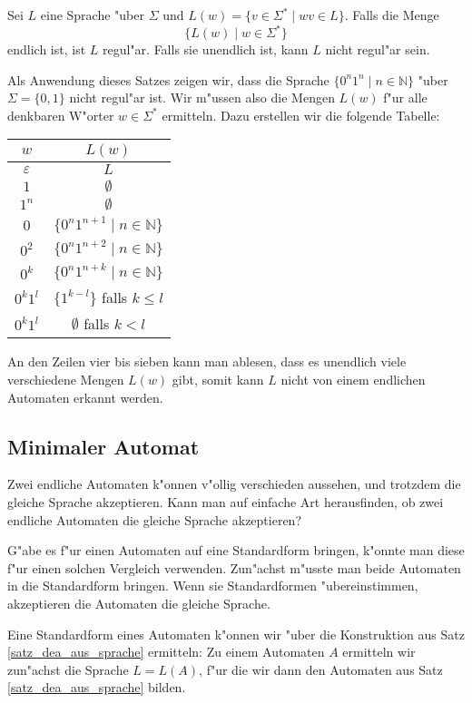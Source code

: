 \begin{satz}
Sei $L$ eine Sprache "uber $\Sigma$ und $L(w)=\{ v\in\Sigma^*\;|\; wv\in L\}$.
Falls die Menge 
\[
\{L(w)\;|\; w\in\Sigma^*\}
\]
endlich ist, ist $L$ regul"ar. Falls sie unendlich ist, kann $L$ nicht
regul"ar sein.
\end{satz}

Als Anwendung dieses Satzes zeigen wir, dass die Sprache
$\{ 0^n1^n \;|\; n\in\mathbb N\}$ "uber $\Sigma=\{0,1\}$
nicht regul"ar ist. Wir m"ussen also
die Mengen $L(w)$ f"ur alle denkbaren W"orter $w\in\Sigma^*$
ermitteln. Dazu erstellen wir die folgende Tabelle:
\begin{center}
\begin{tabular}{|c|c|}
\hline
$w$&$L(w)$\\
\hline
$\varepsilon$&$L$\\
$1$&$\emptyset$\\
$1^n$&$\emptyset$\\
$0$&$\{0^n1^{n+1}\;|\; n\in\mathbb N\}$\\
$0^2$&$\{0^n1^{n+2}\;|\; n\in\mathbb N\}$\\
$0^k$&$\{0^n1^{n+k}\;|\; n\in\mathbb N\}$\\
$0^k1^l$&$\{1^{k-l}\}$ falls $k\le l$\\
$0^k1^l$&$\emptyset $ falls $k<l$\\
\hline
\end{tabular}
\end{center}
An den Zeilen vier bis sieben kann man ablesen, dass es unendlich
viele verschiedene Mengen $L(w)$ gibt, somit kann $L$ nicht von
einem endlichen Automaten erkannt werden.

\subsection{Minimaler Automat\label{regulaer:minimalautomat}}
Zwei endliche Automaten k"onnen v"ollig verschieden aussehen,
und trotzdem die gleiche Sprache akzeptieren. Kann man auf einfache
Art herausfinden, ob zwei endliche Automaten die gleiche Sprache
akzeptieren?

G"abe es f"ur einen Automaten auf eine Standardform bringen, k"onnte
man diese f"ur einen solchen Vergleich verwenden. Zun"achst m"usste
man beide Automaten in die Standardform bringen. Wenn sie Standardformen
"ubereinstimmen, akzeptieren die Automaten die gleiche Sprache.

Eine Standardform eines Automaten k"onnen wir "uber die Konstruktion
aus Satz \ref{satz_dea_aus_sprache} ermitteln: Zu einem Automaten
$A$ ermitteln wir zun"achst die Sprache $L=L(A)$, f"ur die wir dann
den Automaten aus Satz \ref{satz_dea_aus_sprache} bilden.

